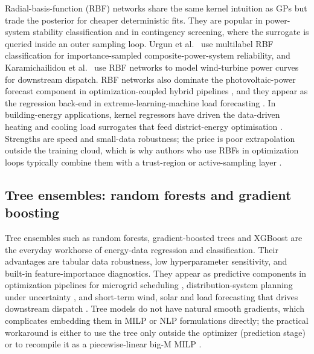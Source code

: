 Radial-basis-function (RBF) networks share the same kernel intuition
as GPs but trade the posterior for cheaper deterministic fits. They
are popular in power-system stability classification and in
contingency screening, where the surrogate is queried inside an outer
sampling loop. Urgun et al.~\cite{Urgun20202791} use multilabel
RBF classification for importance-sampled composite-power-system
reliability, and Karamichailidou et al.~\cite{Karamichailidou20212137}
use RBF networks to model wind-turbine power curves for downstream
dispatch. RBF networks also dominate the photovoltaic-power forecast
component in optimization-coupled hybrid pipelines
\cite{Yang2020415,Tian2020}, and they appear as the regression
back-end in extreme-learning-machine load forecasting
\cite{Zeng2017175,Sideratos2020,Madhukumar20228891,Rafi202132436}.
In building-energy applications, kernel regressors have driven the
data-driven heating and cooling load surrogates that feed
district-energy optimisation
\cite{Koschwitz2018134,Hirvonen2017323,Reynolds2017704,Jia2022553}.
Strengths are speed and small-data robustness; the price is poor
extrapolation outside the training cloud, which is why authors who
use RBFs in optimization loops typically combine them with a
trust-region or active-sampling layer
\cite{Deng2020831,Tian2020,Han2018622,Pang2023}.


\subsection{Tree ensembles: random forests and gradient boosting}
\label{sec:tax:trees}

Tree ensembles such as random forests, gradient-boosted trees and
XGBoost are the everyday workhorse of energy-data regression and
classification. Their advantages are tabular data robustness, low
hyperparameter sensitivity, and built-in feature-importance
diagnostics. They appear as predictive components in optimization
pipelines for microgrid scheduling
\cite{Eseye201991463,Faraji2020157284,Wang20192635,Nematollahi2021},
distribution-system planning under uncertainty
\cite{Fu20202904,Fu2022,Jahangiri20244849,Jahangiri2023}, and
short-term wind, solar and load forecasting that drives downstream
dispatch \cite{Li2020,Hanifi2024,Alkesaiberi2022,Madhukumar20228891}.
Tree models do not have natural smooth gradients, which complicates
embedding them in MILP or NLP formulations directly; the practical
workaround is either to use the tree only outside the optimizer
(prediction stage) or to recompile it as a piecewise-linear
big-M MILP
\cite{Ren2024,Lin2023,Pang2023,Wang20211767}.

